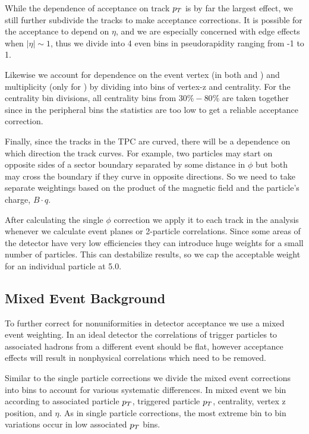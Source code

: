 While the dependence of acceptance on track $p_{T}$ is by far the largest effect, we still further subdivide the tracks to make acceptance corrections. It is possible for the acceptance to depend on $\eta$, and we are especially concerned with edge effects when  $|\eta| \sim 1$, thus we divide into 4 even bins in pseudorapidity ranging from -1 to 1.

Likewise we account for dependence on the event vertex (in both \pp and \auau) and multiplicity (only for \auau) by dividing into bins of vertex-z and centrality. For the centrality bin divisions, all centrality bins from $30\%-80\%$ are taken together since in the peripheral bins the statistics are too low to get a reliable acceptance correction.

Finally, since the tracks in the TPC are curved, there will be a dependence on which direction the track curves. For example, two particles may start on opposite sides of a sector boundary separated by some distance in $\phi$ but both may cross the boundary if they curve in opposite directions. So we need to take separate weightings based on the product of the magnetic field and the particle's charge, $B \cdot q$. 

After calculating the single $\phi$ correction we apply it to each track in the analysis whenever we calculate event planes or 2-particle correlations. Since some areas of the detector have very low efficiencies they can introduce huge weights for a small number of particles. This can destabilize results, so we cap the acceptable weight for an individual particle at 5.0.

\subsection{Mixed Event Background}

To further correct for nonuniformities in detector acceptance we use a mixed event weighting. In an ideal detector the correlations of trigger particles to associated hadrons from a different event should be flat, however acceptance effects will result in nonphysical correlations which need to be removed. 

Similar to the single particle corrections we divide the mixed event corrections into bins to account for various systematic differences. In mixed event we bin according to associated particle $p_{T}$, triggered particle $p_{T}$, centrality, vertex z position, and $\eta$. As in single particle corrections, the most extreme bin to bin variations occur in low associated $p_{T}$ bins.   

